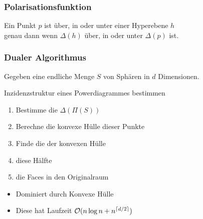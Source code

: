 \begin{frame}
\end{frame}

\begin{frame}
    \frametitle{Polarisationsfunktion}

    \begin{lemma}
        Ein Punkt $p$ ist über, in oder unter einer Hyperebene $h$\\ genau dann wenn $\Delta(h)$ über, in oder unter $\Delta(p)$ ist.
    \end{lemma}
\end{frame}


\begin{frame}
    \frametitle{Dualer Algorithmus}

    Gegeben eine endliche Menge $S$ von Sphären in $d$ Dimensionen.

    \vfill

    \begin{block}{Inzidenzstruktur eines Powerdiagrammes bestimmen}
        \begin{enumerate}
            \item Bestimme die  $\Delta(\Pi(S))$
            \item Berechne die \alert{konvexe Hülle} dieser Punkte
            \item Finde die  der konvexen Hülle
            \item {} diese Hälfte
            \item {} die Faces in den Originalraum
        \end{enumerate}
    \end{block}

    \vfill

    \begin{itemize}
        \item Dominiert durch Konvexe Hülle
        \item Diese hat Laufzeit $\mathcal{O}(n \log n + n^{\left\lceil d/2\right\rceil})$
    \end{itemize}
\end{frame}


